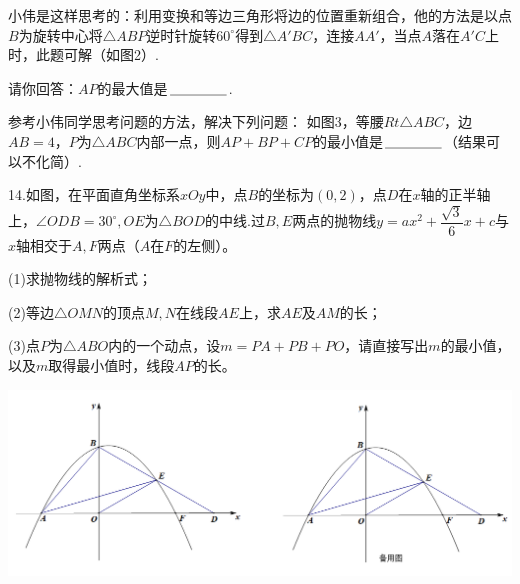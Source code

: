 \documentclass[10pt]{ctexart}
\begin{document}
\begin{shaded}
小伟是这样思考的：利用变换和等边三角形将边的位置重新组合，他的方法是以点$B$为旋转中心将$\triangle ABP$逆时针旋转$60^\circ$得到$\triangle A'BC$，连接$AA'$，当点$A$落在$A'C$上时，此题可解（如图2）.

请你回答：$AP$的最大值是$\underline{\hspace{1.5cm}}$.

参考小伟同学思考问题的方法，解决下列问题：
如图3，等腰$Rt\triangle ABC$，边$AB=4$，$P$为$\triangle ABC$内部一点，则$AP+BP+CP$的最小值是$\underline{\hspace{1.5cm}}$（结果可以不化简）.
\end{shaded}

\vspace{1cm}

\begin{shaded}
14.如图，在平面直角坐标系$xOy$中，点$B$的坐标为$(0,2)$，点$D$在$x$轴的正半轴上，$\angle ODB=30^\circ,OE$为$\triangle BOD$的中线.过$B,E$两点的抛物线$y=ax^2+\dfrac{\sqrt{3}}{6}x+c$与$x$轴相交于$A,F$两点（$A$在$F$的左侧）。

(1)求抛物线的解析式；

(2)等边$\triangle OMN$的顶点$M,N$在线段$AE$上，求$AE$及$AM$的长；

(3)点$P$为$\triangle ABO$内的一个动点，设$m=PA+PB+PO$，请直接写出$m$的最小值，以及$m$取得最小值时，线段$AP$的长。
\end{shaded}

\begin{center}
	\includegraphics[scale=0.6]{figure/feimadian08}
\end{center}
\end{document}
